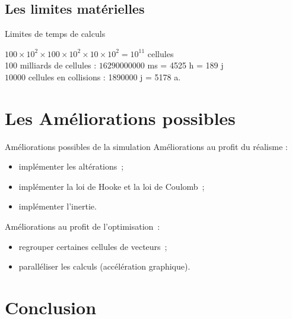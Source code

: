 \documentclass{beamer}
\begin{document}
\subsection{Les limites matérielles}
\begin{frame}{Limites de temps de calculs}
  \begin{center}
  \end{center}
  \begin{center}
  \end{center}
  $100 \times 10^2 \times 100 \times 10^2 \times 10 \times 10^2 = 10^{11}$ cellules \\
  100 milliards de cellules : $16290000000$ ms = 4525 h = 189 j\\
  $10000$ cellules en collisions : 1890000 j = 5178 a.
\end{frame}

\section{Les Améliorations possibles}
\begin{frame}{Améliorations possibles de la simulation}
  Améliorations au profit du réalisme :
  \begin{itemize}
    \item implémenter les altérations~;
    \item implémenter la loi de Hooke et la loi de Coulomb~;
    \item implémenter l'inertie.
  \end{itemize}
  Améliorations au profit de l'optimisation~:
  \begin{itemize}
    \item regrouper certaines cellules de vecteurs~;
    \item paralléliser les calculs (accélération graphique).
  \end{itemize}
\end{frame}

\section{Conclusion}
\end{document}
